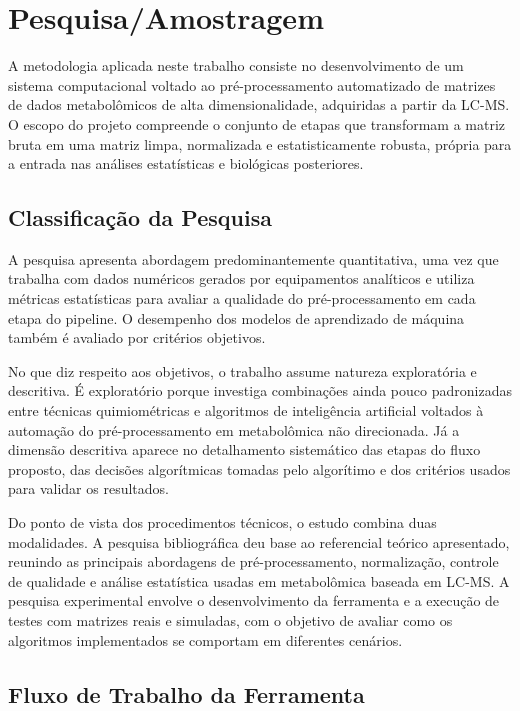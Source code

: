 % 

\chapter[Pesquisa/Amostragem]{Pesquisa/Amostragem}

A metodologia aplicada neste trabalho consiste no desenvolvimento de um sistema computacional voltado ao pré-processamento automatizado de matrizes de dados metabolômicos de alta dimensionalidade, adquiridas a partir da LC-MS. O escopo do projeto compreende o conjunto de etapas que transformam a matriz bruta em uma matriz limpa, normalizada e estatisticamente robusta, própria para a entrada nas análises estatísticas e biológicas posteriores.
 
\section{Classificação da Pesquisa}
A pesquisa apresenta abordagem predominantemente quantitativa, uma vez que trabalha com dados numéricos gerados por equipamentos analíticos e utiliza métricas estatísticas para avaliar a qualidade do pré-processamento em cada etapa do pipeline. O desempenho dos modelos de aprendizado de máquina também é avaliado por critérios objetivos. 

No que diz respeito aos objetivos, o trabalho assume natureza exploratória e descritiva. É exploratório porque investiga combinações ainda pouco padronizadas entre técnicas quimiométricas e algoritmos de inteligência artificial voltados à automação do pré-processamento em metabolômica não direcionada. Já a dimensão descritiva aparece no detalhamento sistemático das etapas do fluxo proposto, das decisões algorítmicas tomadas pelo algorítimo e dos critérios usados para validar os resultados.
 
Do ponto de vista dos procedimentos técnicos, o estudo combina duas modalidades. A pesquisa bibliográfica deu base ao referencial teórico apresentado, reunindo as principais abordagens de pré-processamento, normalização, controle de qualidade e análise estatística usadas em metabolômica baseada em LC-MS. A pesquisa experimental envolve o desenvolvimento da ferramenta e a execução de testes com matrizes reais e simuladas, com o objetivo de avaliar como os algoritmos implementados se comportam em diferentes cenários.

\section{Fluxo de Trabalho da Ferramenta}
 
